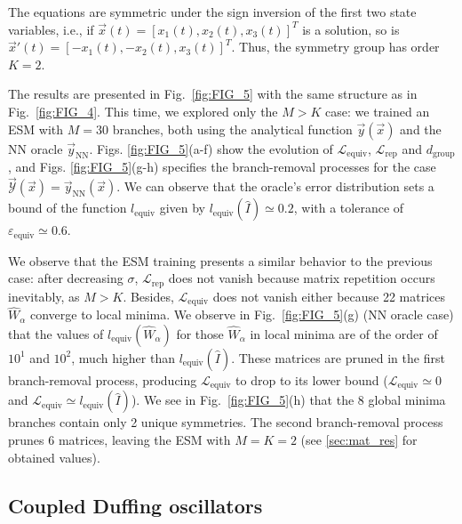 The equations are symmetric under the sign inversion of the first two state variables, i.e., if $\vec{x} (t) = \left[ x_1 (t) , x_2 (t), x_3 (t) \right]^T$ is a solution, so is $\vec{x}' (t) = \left[ -x_1 (t) , -x_2 (t), x_3 (t) \right]^T$. Thus, the symmetry group has order $K = 2$.

The results are presented in Fig.~\ref{fig:FIG_5} with the same structure as in Fig.~\ref{fig:FIG_4}. This time, we explored only the $M>K$ case: we trained an ESM with $M = 30$ branches, both using the analytical function $\vec{y}(\vec{x})$ and the NN oracle $\vec{y}_{\mathrm{NN}}$. Figs. \ref{fig:FIG_5}(a-f) show the evolution of $\mathcal{L}_{\mathrm{equiv}}$, $\mathcal{L}_{\mathrm{rep}}$ and $d_{\mathrm{group}}$, and Figs. \ref{fig:FIG_5}(g-h) specifies the branch-removal processes for the case $\vec{\mathcal{Y}}(\vec{x}) = \vec{y}_{\mathrm{NN}} (\vec{x})$. We can observe that the oracle's error distribution sets a bound of the function $l_{\mathrm{equiv}}$ given by $l_{\mathrm{equiv}}(\hat{I}) \simeq 0.2$, with a tolerance of $\varepsilon_{\mathrm{equiv}} \simeq 0.6$.

We observe that the ESM training presents a similar behavior to the previous case: after decreasing $\sigma$, $\mathcal{L}_{\mathrm{rep}}$ does not vanish because matrix repetition occurs inevitably, as $M>K$. Besides, $\mathcal{L}_{\mathrm{equiv}}$ does not vanish either because 22 matrices $\hat{W}_{\alpha}$ converge to local minima. We observe in Fig.~\ref{fig:FIG_5}(g) (NN oracle case) that the values of $l_{\mathrm{equiv}}(\hat{W}_{\alpha})$ for those $\hat{W}_{\alpha}$ in local minima are of the order of $10^{1}$ and $10^{2}$, much higher than $l_{\mathrm{equiv}}(\hat{I})$. These matrices are pruned in the first branch-removal process, producing $\mathcal{L}_{\mathrm{equiv}}$ to drop to its lower bound ($\mathcal{L}_{\mathrm{equiv}} \simeq 0$ and $\mathcal{L}_{\mathrm{equiv}} \simeq l_{\mathrm{equiv}}(\hat{I})$). We see in Fig.~\ref{fig:FIG_5}(h) that the 8 global minima branches contain only 2 unique symmetries. The second branch-removal process prunes 6 matrices, leaving the ESM with $M = K = 2$ (see \ref{sec:mat_res} for obtained values).




\subsection{Coupled Duffing oscillators}\label{sec:duffing}

